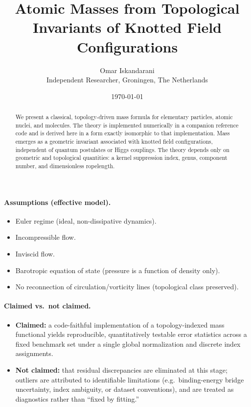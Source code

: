\documentclass[11pt,a4paper]{article}
\title{\textbf{Atomic Masses from Topological Invariants of Knotted Field Configurations}}
\author{Omar Iskandarani\\
Independent Researcher, Groningen, The Netherlands}
\date{\today}
\begin{document}
    \maketitle

    \begin{abstract}
        We present a classical, topology-driven mass formula for elementary particles,
        atomic nuclei, and molecules.
        The theory is implemented numerically in a companion reference code and is
        derived here in a form exactly isomorphic to that implementation.
        Mass emerges as a geometric invariant associated with knotted field
        configurations, independent of quantum postulates or Higgs couplings.
        The theory depends only on geometric and topological quantities: a kernel
        suppression index, genus, component number, and dimensionless ropelength.
    \end{abstract}

\paragraph{Assumptions (effective model).}
\begin{itemize}
    \item Euler regime (ideal, non-dissipative dynamics).
    \item Incompressible flow.
    \item Inviscid flow.
    \item Barotropic equation of state (pressure is a function of density only).
    \item No reconnection of circulation/vorticity lines (topological class preserved).
\end{itemize}

\paragraph{Claimed vs.\ not claimed.}
\begin{itemize}
    \item \textbf{Claimed:} a code-faithful implementation of a topology-indexed mass functional yields reproducible, quantitatively testable error statistics across a fixed benchmark set under a single global normalization and discrete index assignments.
    \item \textbf{Not claimed:} that residual discrepancies are eliminated at this stage; outliers are attributed to identifiable limitations (e.g.\ binding-energy bridge uncertainty, index ambiguity, or dataset conventions), and are treated as diagnostics rather than ``fixed by fitting.''
\end{itemize}
\end{document}
